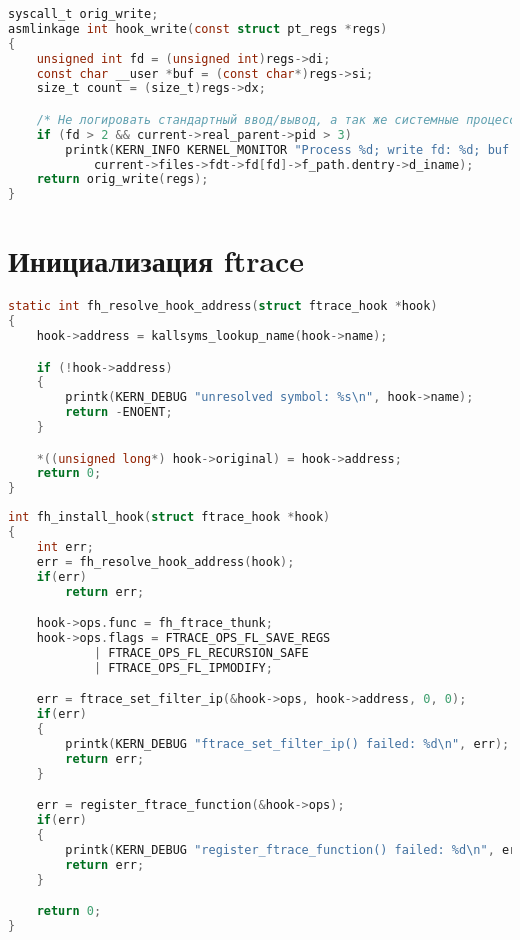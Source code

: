     \begin{lstlisting}[language=C, label=lst:syscall-hooking:write, caption=Функция-обёртка системного вызова write]
syscall_t orig_write;
asmlinkage int hook_write(const struct pt_regs *regs)
{
    unsigned int fd = (unsigned int)regs->di;
    const char __user *buf = (const char*)regs->si;
    size_t count = (size_t)regs->dx;

    /* Не логировать стандартный ввод/вывод, а так же системные процессы */
    if (fd > 2 && current->real_parent->pid > 3)
        printk(KERN_INFO KERNEL_MONITOR "Process %d; write fd: %d; buf: %p; count: %ld; filename: %s\n", current->pid, fd, buf, count,
            current->files->fdt->fd[fd]->f_path.dentry->d_iname);
    return orig_write(regs);
}
    \end{lstlisting}

\section{Инициализация ftrace}

    \begin{lstlisting}[language=C, label=lst:ftrace-hooking:resolve_hook_address, caption=Поиск адреса функции по символьному имени]
static int fh_resolve_hook_address(struct ftrace_hook *hook)
{
    hook->address = kallsyms_lookup_name(hook->name);

    if (!hook->address)
    {
        printk(KERN_DEBUG "unresolved symbol: %s\n", hook->name);
        return -ENOENT;
    }

    *((unsigned long*) hook->original) = hook->address;
    return 0;
}
    \end{lstlisting}

    \begin{lstlisting}[language=C, label=lst:ftrace-hooking:install_hook, caption=Установка перехвата функции]
int fh_install_hook(struct ftrace_hook *hook)
{
    int err;
    err = fh_resolve_hook_address(hook);
    if(err)
        return err;

    hook->ops.func = fh_ftrace_thunk;
    hook->ops.flags = FTRACE_OPS_FL_SAVE_REGS
            | FTRACE_OPS_FL_RECURSION_SAFE
            | FTRACE_OPS_FL_IPMODIFY;

    err = ftrace_set_filter_ip(&hook->ops, hook->address, 0, 0);
    if(err)
    {
        printk(KERN_DEBUG "ftrace_set_filter_ip() failed: %d\n", err);
        return err;
    }

    err = register_ftrace_function(&hook->ops);
    if(err)
    {
        printk(KERN_DEBUG "register_ftrace_function() failed: %d\n", err);
        return err;
    }

    return 0;
}
    \end{lstlisting}


